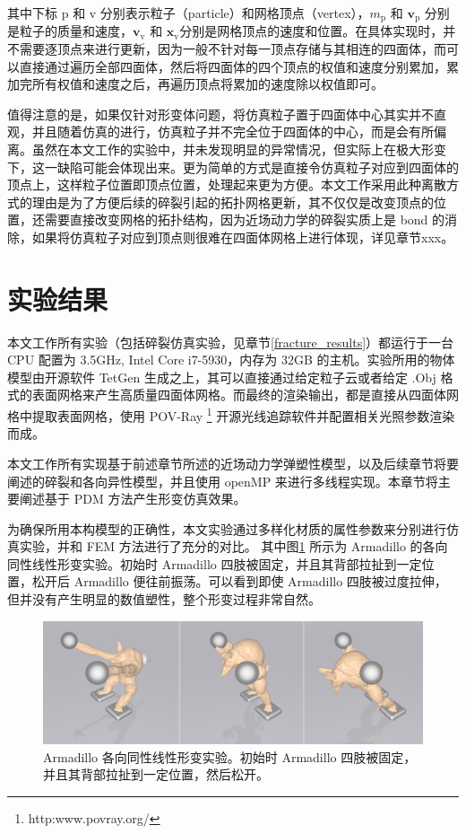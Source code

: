 其中下标 $\mathrm{p}$ 和 $\mathrm{v}$ 分别表示粒子（particle）和网格顶点（vertex），$m_{\mathrm{p}}$ 和 $\textbf{v}_{\mathrm{p}}$ 分别是粒子的质量和速度，$\textbf{v}_{\mathrm{v}}$ 和 $\textbf{x}_{\mathrm{v}}$分别是网格顶点的速度和位置。在具体实现时，并不需要逐顶点来进行更新，因为一般不针对每一顶点存储与其相连的四面体，而可以直接通过遍历全部四面体，然后将四面体的四个顶点的权值和速度分别累加，累加完所有权值和速度之后，再遍历顶点将累加的速度除以权值即可。

值得注意的是，如果仅针对形变体问题，将仿真粒子置于四面体中心其实并不直观，并且随着仿真的进行，仿真粒子并不完全位于四面体的中心，而是会有所偏离。虽然在本文工作的实验中，并未发现明显的异常情况，但实际上在极大形变下，这一缺陷可能会体现出来。更为简单的方式是直接令仿真粒子对应到四面体的顶点上，这样粒子位置即顶点位置，处理起来更为方便。本文工作采用此种离散方式的理由是为了方便后续的碎裂引起的拓扑网格更新，其不仅仅是改变顶点的位置，还需要直接改变网格的拓扑结构，因为近场动力学的碎裂实质上是 bond 的消除，如果将仿真粒子对应到顶点则很难在四面体网格上进行体现，详见章节xxx。



\section{实验结果}
\label{deformation_results}

本文工作所有实验（包括碎裂仿真实验，见章节\ref{fracture_results}）都运行于一台 CPU 配置为 3.5GHz, Intel Core i7-5930，内存为 32GB 的主机。实验所用的物体模型由开源软件 TetGen 生成之上，其可以直接通过给定粒子云或者给定 .Obj 格式的表面网格来产生高质量四面体网格。而最终的渲染输出，都是直接从四面体网格中提取表面网格，使用 POV-Ray \footnote{http:www.povray.org/} 开源光线追踪软件并配置相关光照参数渲染而成。

本文工作所有实现基于前述章节所述的近场动力学弹塑性模型，以及后续章节将要阐述的碎裂和各向异性模型，并且使用 openMP 来进行多线程实现。本章节将主要阐述基于 PDM 方法产生形变仿真效果。

为确保所用本构模型的正确性，本文实验通过多样化材质的属性参数来分别进行仿真实验，并和 FEM 方法进行了充分的对比。
其中图\ref{demo_pull_armadillo} 所示为 Armadillo 的各向同性线性形变实验。初始时 Armadillo 四肢被固定，并且其背部拉扯到一定位置，松开后 Armadillo 便往前振荡。可以看到即使 Armadillo 四肢被过度拉伸，但并没有产生明显的数值塑性，整个形变过程非常自然。


\begin{figure}[!htb]
  \centering
  \captionsetup{justification=centering}
  \includegraphics[width=0.9\linewidth]{chap/image/demo_pull_armadillo}

  \caption{\label{demo_pull_armadillo}
           Armadillo 各向同性线性形变实验。初始时 Armadillo 四肢被固定，并且其背部拉扯到一定位置，然后松开。
          }
\end{figure}

